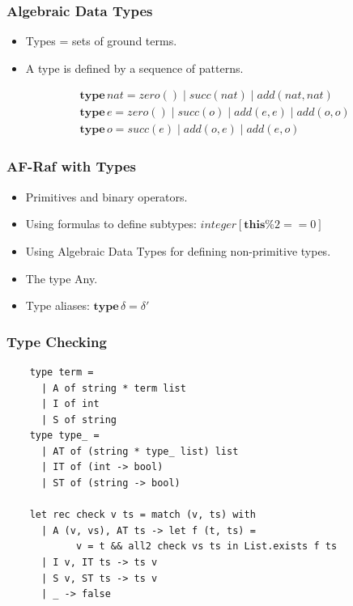 \documentclass{beamer}
\begin{document}
\begin{frame}[fragile]
\frametitle{Algebraic Data Types}
\begin{itemize}
\item
  Types = sets of ground terms.
\item
  A type is defined by a sequence of patterns.
\end{itemize}
\begin{align}
&\mathbf{type}\,\mathit{nat} =
      \mathit{zero}()
  \mid\mathit{succ}(\mathit{nat})
  \mid\mathit{add}(\mathit{nat},\mathit{nat}) \\
&\mathbf{type}\,e =
      \mathit{zero}()
  \mid\mathit{succ}(o)
  \mid\mathit{add}(e,e)
  \mid\mathit{add}(o,o) \\
&\mathbf{type}\,o =
      \mathit{succ}(e)
  \mid\mathit{add}(o,e)
  \mid\mathit{add}(e,o)
\end{align}
\end{frame}

\begin{frame}[fragile]
\frametitle{AF-Raf with Types}
\begin{itemize}
\item
  Primitives and binary operators.
\item
  Using formulas to define subtypes:
 $\mathit{integer}[\mathbf{this}\%2==0]$ 
\item
  Using Algebraic Data Types for defining non-primitive types.
\item 
  The type Any.
\item 
  Type aliases: $\mathbf{type}\,\delta=\delta'$
\end{itemize}
\note[item]{}
\end{frame}

\begin{frame}[fragile]
\frametitle{Type Checking}
\begin{verbatim}
    type term = 
      | A of string * term list 
      | I of int 
      | S of string
    type type_ =
      | AT of (string * type_ list) list
      | IT of (int -> bool)
      | ST of (string -> bool)

    let rec check v ts = match (v, ts) with
      | A (v, vs), AT ts -> let f (t, ts) =
            v = t && all2 check vs ts in List.exists f ts
      | I v, IT ts -> ts v
      | S v, ST ts -> ts v
      | _ -> false
\end{verbatim}
\note[item]{}
\end{frame}
\end{document}
